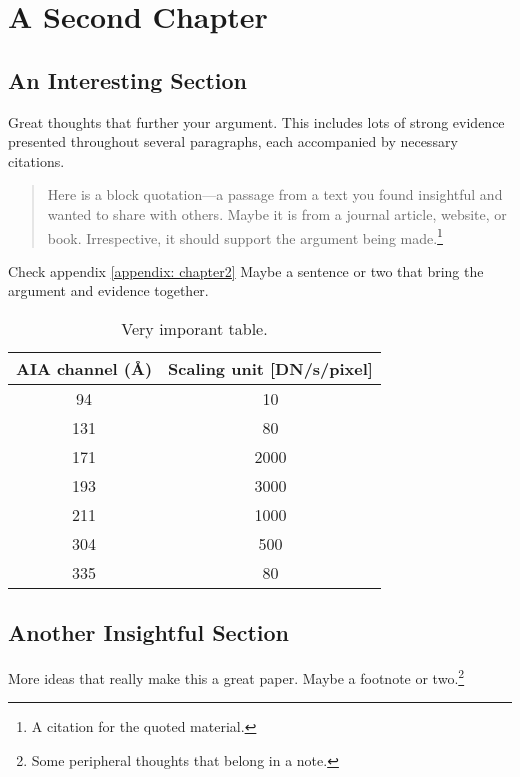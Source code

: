 \chapter{A Second Chapter}
\label{chapter:two}


\section{An Interesting Section}

Great thoughts that further your argument. This includes lots of strong evidence presented throughout several paragraphs, each accompanied by necessary citations.
\begin{quotation}
    \noindent Here is a block quotation---a passage from a text you found insightful and wanted to share with others. Maybe it is from a journal article, website, or book. Irrespective, it should support the argument being made.\footnote{A citation for the quoted material.}
\end{quotation}

Check appendix \ref{appendix: chapter2}
Maybe a sentence or two that bring the argument and evidence together.\citep{dos_santos_2020}

\begin{table}[h!]
  \centering
  \caption{Very imporant table.}
  \label{tab:average_channels}
  \begin{tabular}{cc}
    \toprule
     AIA channel (\AA) &  Scaling unit [DN/s/pixel] \\
     \midrule
      94 &   10  \\
      131 &   80  \\
      171 & 2000  \\
      193 & 3000  \\
      211 & 1000  \\
      304 &  500  \\
      335 &   80  \\
      \bottomrule
  \end{tabular}
\end{table}


\section{Another Insightful Section}

More ideas that really make this a great paper. Maybe a footnote or two.\footnote{Some peripheral thoughts that belong in a note.}
